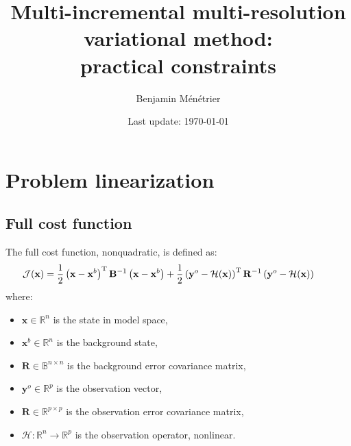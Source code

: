 \documentclass[12pt]{scrartcl}
\begin{document}
\title{\vspace{-1.2cm}Multi-incremental multi-resolution variational method:\\ practical constraints}
\author{Benjamin Ménétrier}
\date{Last update: \today\vspace{-0.5cm}}

\thispagestyle{empty}

\maketitle

\tableofcontents

\section{Problem linearization}

\subsection{Full cost function}
The full cost function, nonquadratic, is defined as:
\begin{align}
\hspace{-0.7cm} \mathcal{J}(\mathbf{x}) = \frac{1}{2} \left(\mathbf{x}-\mathbf{x}^b\right)^\mathrm{T} \mathbf{B}^{-1} \left(\mathbf{x}-\mathbf{x}^b\right) + \frac{1}{2} \left(\mathbf{y}^o-\mathcal{H}(\mathbf{x})\right)^\mathrm{T} \mathbf{R}^{-1} \left(\mathbf{y}^o-\mathcal{H}(\mathbf{x})\right)
\end{align}
where:
\begin{itemize}
\item $\mathbf{x} \in \mathbb{R}^n$ is the state in model space,
\item $\mathbf{x}^b \in \mathbb{R}^n$ is the background state,
\item $\mathbf{R} \in \mathbb{B}^{n \times n}$ is the background error covariance matrix,
\item $\mathbf{y}^o \in \mathbb{R}^p$ is the observation vector,
\item $\mathbf{R} \in \mathbb{R}^{p \times p}$ is the observation error covariance matrix,
\item $\mathcal{H} : \mathbb{R}^n \rightarrow \mathbb{R}^p$ is the observation operator, nonlinear.
\end{itemize}
\end{document}

